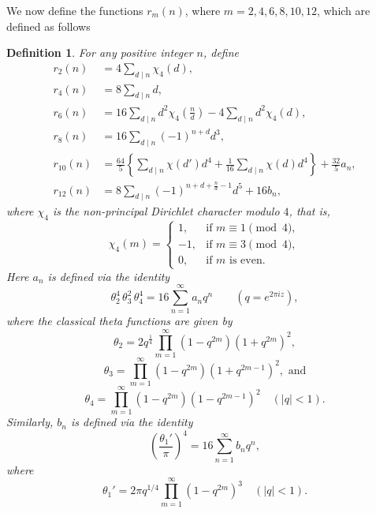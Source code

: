 \documentclass[10pt]{amsart}
\newtheorem{defn}[theorem]{Definition}
\begin{document}
We now define the functions $r_m(n)$, where $m=2,4,6,8,10,12$, which are defined as follows
\begin{defn} \cite[p.~121]{Grosswald}
For any positive integer $n$, define
\begin{align} 
    r_2(n) &= 4\sum_{d \mid n}\chi_4(d), \label{eq:r_2(n)} \\
    r_4(n) &= 8\sum_{d \mid n}d, \label{eq:r_4(n)} \\
    r_6(n) &= 16\sum_{d \mid n}d^2\chi_4\left(\frac{n}{d}\right) - 4\sum_{d \mid n}d^2\chi_4(d), \label{eq:r_6(n)} \\
    r_8(n) &= 16\sum_{d \mid n}(-1)^{n+d}d^3, \label{eq:r_8(n)} \\
    r_{10}(n) &= \frac{64}{5}\left\{ \sum_{d \mid n}\chi(d')d^4 + \frac{1}{16}\sum_{d \mid n}\chi(d)d^4 \right\} + \frac{32}{5}a_n, \label{eq:r_10} \\
    r_{12}(n) &= 8\sum_{d \mid n}(-1)^{n+d+\frac{n}{d}-1}d^5 + 16b_n, \label{eq:r_12}
\end{align}
where $\chi_4$ is the non-principal Dirichlet character modulo $4$, that is,
\begin{equation}
    \chi_4(m) = 
    \begin{cases} 
         1, & \text{if } m \equiv 1 \pmod 4, \\
        -1, & \text{if } m \equiv 3 \pmod 4, \\
         0, & \text{if } m \text{ is even.}
    \end{cases}
\end{equation}
Here $a_n$ is defined via the identity
\[
\theta_2^4 \, \theta_3^2 \, \theta_4^4 = 16 \sum_{n=1}^\infty a_n q^n \qquad (q = e^{2\pi i z}),
\]
where the classical theta functions are given by
$$\theta_2= 2q^{\frac{1}{4}}\prod_{m=1}^{\infty}(1-q^{2m})(1+q^{2m})^2,$$
$$\theta_3= \prod_{m=1}^{\infty}(1-q^{2m})(1+q^{2m-1})^2,\text{ and}$$
$$\theta_4= \prod_{m=1}^{\infty}(1-q^{2m})(1-q^{2m-1})^2 \quad (|q|<1).$$ 
Similarly, $b_n$ is defined via the identity
\[
\left (\frac{\theta_1'}{\pi}\right)^4 = 16 \sum_{n=1}^\infty b_n q^n ,
\]
where %
$$ \theta_1' = 2\pi q^{1/4}\prod_{m=1}^{\infty}(1-q^{2m})^3 \quad (|q| < 1).$$
\end{defn}
\end{document}
